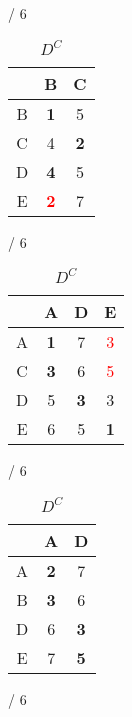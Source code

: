 \documentclass[a4paper, 11 pt, article, accentcolor=tud7b]{tudreport}
\begin{document}
	\begin{table}[h]
	  \begin{subtable}[b]{\textwidth / 6}
	    \begin{tabular}{| c | c | c |}
	      \hline
	        & B                   & C          \\ \hline
	      B & \textbf{1}          & 5          \\ \hline
	      C & 4                   & \textbf{2} \\ \hline
	      D & \textbf{4}          & 5          \\ \hline
	      E & \textbf{\textcolor{red}{2}}          & 7          \\ \hline
	    \end{tabular}
	    \caption{$D^{A}$}
	  \end{subtable}
	  \hfill
	  \begin{subtable}[b]{\textwidth / 6}
	    \begin{tabular}{| c | c | c | c |}
	    \hline
	      & A                   & D          & E                  \\ \hline
	    A & \textbf{1}          & 7          & \textcolor{red}{3} \\ \hline
	    C & \textbf{3}          & 6          & \textcolor{red}{5} \\ \hline
	    D & 5                   & \textbf{3} & 3                  \\ \hline
	    E & 6                   & 5          & \textbf{1}         \\ \hline
	    \end{tabular}
	    \caption{$D^{B}$}
	  \end{subtable}
	  \hfill
	  \begin{subtable}[b]{\textwidth / 6}
	    \begin{tabular}{| c | c | c |}
	    \hline
	      & A                   & D          \\ \hline
	    A & \textbf{2}          & 7          \\ \hline
	    B & \textbf{3}          & 6          \\ \hline
	    D & 6                   & \textbf{3} \\ \hline
	    E & 7                   & \textbf{5} \\ \hline
	    \end{tabular}
	    \caption{$D^{C}$}
	  \end{subtable}
    \hfill
	  \begin{subtable}[b]{\textwidth / 6}

\end{subtable}
\end{table}
\end{document}

